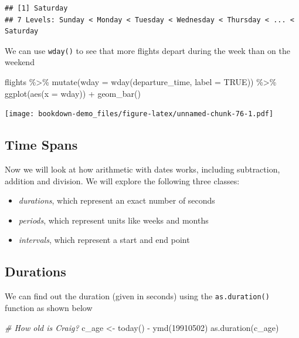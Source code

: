 \documentclass[
]{book}
\newenvironment{Shaded}{\begin{snugshade}}{\end{snugshade}}
\newcommand{\AttributeTok}[1]{\textcolor[rgb]{0.77,0.63,0.00}{#1}}
\newcommand{\CommentTok}[1]{\textcolor[rgb]{0.56,0.35,0.01}{\textit{#1}}}
\newcommand{\ConstantTok}[1]{\textcolor[rgb]{0.00,0.00,0.00}{#1}}
\newcommand{\DecValTok}[1]{\textcolor[rgb]{0.00,0.00,0.81}{#1}}
\newcommand{\FunctionTok}[1]{\textcolor[rgb]{0.00,0.00,0.00}{#1}}
\newcommand{\NormalTok}[1]{#1}
\newcommand{\OtherTok}[1]{\textcolor[rgb]{0.56,0.35,0.01}{#1}}
\newcommand{\SpecialCharTok}[1]{\textcolor[rgb]{0.00,0.00,0.00}{#1}}
\providecommand{\tightlist}{%
  \setlength{\itemsep}{0pt}\setlength{\parskip}{0pt}}
\begin{document}
\begin{verbatim}
## [1] Saturday
## 7 Levels: Sunday < Monday < Tuesday < Wednesday < Thursday < ... < Saturday
\end{verbatim}

We can use \texttt{wday()} to see that more flights depart during the week than on the weekend

\begin{Shaded}
\begin{Highlighting}[]
\NormalTok{flights }\SpecialCharTok{\%\textgreater{}\%} 
  \FunctionTok{mutate}\NormalTok{(}\AttributeTok{wday =} \FunctionTok{wday}\NormalTok{(departure\_time, }\AttributeTok{label =} \ConstantTok{TRUE}\NormalTok{)) }\SpecialCharTok{\%\textgreater{}\%} 
  \FunctionTok{ggplot}\NormalTok{(}\FunctionTok{aes}\NormalTok{(}\AttributeTok{x =}\NormalTok{ wday)) }\SpecialCharTok{+}
    \FunctionTok{geom\_bar}\NormalTok{()}
\end{Highlighting}
\end{Shaded}

\texttt{[image: bookdown-demo\_files/figure-latex/unnamed-chunk-76-1.pdf]}

\hypertarget{time-spans}{%
\subsection{Time Spans}\label{time-spans}}

Now we will look at how arithmetic with dates works, including subtraction, addition and division. We will explore the following three classes:

\begin{itemize}
\tightlist
\item
  \emph{durations}, which represent an exact number of seconds
\item
  \emph{periods}, which represent units like weeks and months
\item
  \emph{intervals}, which represent a start and end point
\end{itemize}

\hypertarget{durations}{%
\subsection{Durations}\label{durations}}

We can find out the duration (given in seconds) using the \texttt{as.duration()} function as shown below

\begin{Shaded}
\begin{Highlighting}[]
\CommentTok{\# How old is Craig?}
\NormalTok{c\_age }\OtherTok{\textless{}{-}} \FunctionTok{today}\NormalTok{() }\SpecialCharTok{{-}} \FunctionTok{ymd}\NormalTok{(}\DecValTok{19910502}\NormalTok{)}
\FunctionTok{as.duration}\NormalTok{(c\_age)}
\end{Highlighting}
\end{Shaded}
\end{document}
